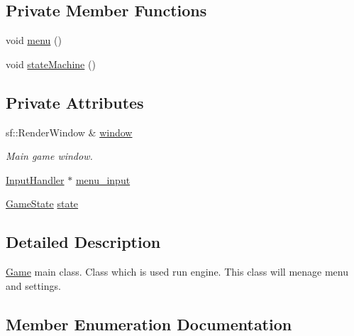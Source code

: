\subsection*{Private Member Functions}
\begin{DoxyCompactItemize}
\item 
void \hyperlink{class_game_a463932fa7ca2f1ce243279bf2422fc48}{menu} ()
\item 
void \hyperlink{class_game_a8bc94200bfbf0421b83b7c2b2b45da72}{state\+Machine} ()
\end{DoxyCompactItemize}
\subsection*{Private Attributes}
\begin{DoxyCompactItemize}
\item 
sf\+::\+Render\+Window \& \hyperlink{class_game_ad0fb4d8653dcf289fd6573cf5ba0f3d1}{window}
\begin{DoxyCompactList}\small\item\em Main game window. \end{DoxyCompactList}\item 
\hyperlink{class_input_handler}{Input\+Handler} $\ast$ \hyperlink{class_game_af851bd0efbb65bb637f434f90bcdcae6}{menu\+\_\+input}
\item 
\hyperlink{class_game_a7f57a7a8408e554d0a72882c287e1d04}{Game\+State} \hyperlink{class_game_ad9fc2a8710ee56916f79314b91112ed0}{state}
\end{DoxyCompactItemize}


\subsection{Detailed Description}
\hyperlink{class_game}{Game} main class. Class which is used run engine. This class will menage menu and settings. 

\subsection{Member Enumeration Documentation}
\hypertarget{class_game_a7f57a7a8408e554d0a72882c287e1d04}{}
